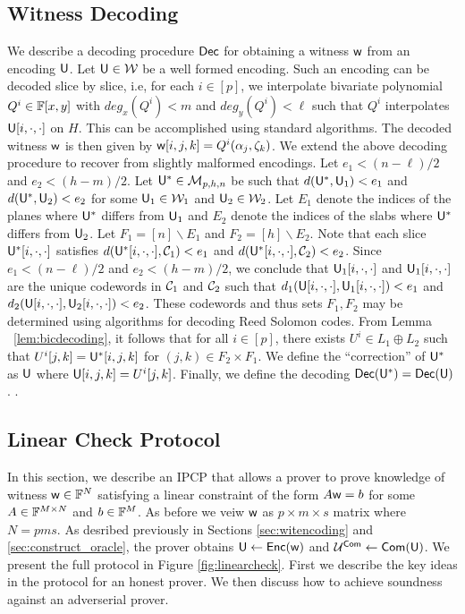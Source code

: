 \subsection{Witness Decoding}\label{sec:witdecoding}
We describe a decoding procedure $\mathsf{Dec}$ for obtaining a witness $\mathsf{w}$ from an encoding
$\mathsf{U}$. Let $\mathsf{U}\in \mathcal{W}$ be a well formed encoding. Such an encoding can
be decoded slice by slice, i.e, for each $i\in [p]$, we interpolate bivariate
polynomial $Q^i\in \mathbb{F}[x,y]$ with $deg_x(Q^i)<m$ and $deg_y(Q^i)<\ell$ such that
$Q^i$ interpolates $\mathsf{U}[i,\cdot,\cdot]$ on $H$. This can be accomplished using
standard algorithms. The decoded witness $\mathsf{w}$ is then given by
$\mathsf{w}[i,j,k]=Q^i(\alpha_j,\zeta_k)$. We extend the above decoding procedure to
recover from slightly malformed encodings. Let
$e_1<(n-\ell)/2$ and $e_2<(h-m)/2$. Let $\mathsf{U}^*\in \mathcal{M}_{p,h,n}$ be such
that $d(\mathsf{U}^*,\mathsf{U}_1)<e_1$ and $d(\mathsf{U}^*,\mathsf{U}_2)<e_2$ for some $\mathsf{U}_1\in
\mathcal{W}_1$ and $\mathsf{U}_2\in \mathcal{W}_2$. Let $E_1$ denote
the indices of the planes where $\mathsf{U}^*$ differs from $\mathsf{U}_1$ and 
$E_2$ denote the indices of the slabs where $\mathsf{U}^*$ differs from $\mathsf{U}_2$.
Let $F_1=[n]\backslash E_1$ and
$F_2=[h]\backslash E_2$. Note that each
slice $\mathsf{U}^*[i,\cdot,\cdot]$ satisfies
$d(\mathsf{U}^*[i,\cdot,\cdot],\mathcal{C}_1)<e_1$  and
$d(\mathsf{U}^*[i,\cdot,\cdot],\mathcal{C}_2)<e_2$. Since $e_1<(n-\ell)/2$ and
$e_2<(h-m)/2$, we conclude that $\mathsf{U}_1[i,\cdot,\cdot]$ and
$\mathsf{U}_1[i,\cdot,\cdot]$ are the unique codewords in $\mathcal{C}_1$ and $\mathcal{C}_2$
such that $d_1(\mathsf{U}[i,\cdot,\cdot],\mathsf{U}_1[i,\cdot,\cdot])<e_1$ and
$d_2(\mathsf{U}[i,\cdot,\cdot],\mathsf{U}_2[i,\cdot,\cdot])<e_2$. These codewords and thus
sets $F_1,F_2$ may be
determined using algorithms for decoding Reed Solomon codes. From Lemma ~\ref{lem:bicdecoding}, it follows that for all $i\in [p]$, there exists $U^i\in L_1\oplus L_2$ such
that $U^i[j,k]=\mathsf{U}^*[i,j,k]$ for $(j,k)\in F_2\times F_1$. We define the
``correction'' of $\mathsf{U}^*$ as $\mathsf{U}$ where
$\mathsf{U}[i,j,k]=U^i[j,k]$. Finally, we define the decoding $\mathsf{Dec}(\mathsf{U}^*) =
\mathsf{Dec}(\mathsf{U})$.
.


\subsection{Linear Check Protocol}\label{sec:lincheck}
In this section, we describe an IPCP that allows a prover to prove knowledge of
witness $\mathsf{w}\in \mathbb{F}^N$ satisfying a linear constraint of the form $A\mathsf{w} = b$
for some $A\in \mathbb{F}^{M\times N}$ and $b\in \mathbb{F}^M$. As before we veiw $\mathsf{w}$ as
$p\times m\times s$ matrix where $N=pms$. As desribed previously in Sections
\ref{sec:witencoding} and \ref{sec:construct_oracle}, the prover obtains $\mathsf{U}\gets 
\mathsf{Enc}(\mathsf{w})$ and $\mathcal{U}^{\mathsf{Com}}\gets \mathsf{Com}(\mathsf{U})$. We present the full protocol in
Figure \ref{fig:linearcheck}. First we describe the key ideas in the protocol
for an honest prover. We then discuss how to achieve soundness against an
adverserial prover.\smallskip

